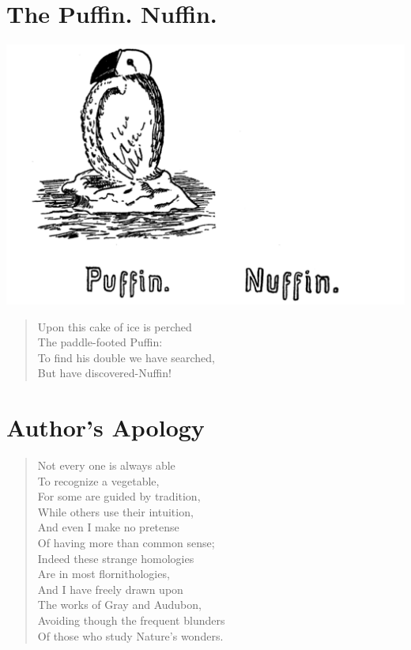 \documentclass[letterpaper, 10pt, openany]{memoir}
\begin{document}
\chapter{The Puffin. Nuffin.}
\includegraphics[width=1\textwidth]{f-p27.png}
\vspace{\onelineskip}
\begin{verse}\huge
Upon this cake of ice is perched\\
The paddle-footed Puffin:\\
To find his double we have searched,\\
But have discovered-Nuffin!\\
\end{verse}

\chapter{Author's Apology}
\begin{verse}\huge
Not every one is always able\\
To recognize a vegetable,\\
For some are guided by tradition,\\
While others use their intuition,\\
And even I make no pretense\\
Of having more than common sense;\\
Indeed these strange homologies\\
Are in most flornithologies,\\
And I have freely drawn upon\\
The works of Gray and Audubon,\\
Avoiding though the frequent blunders\\
Of those who study Nature's wonders.\\
\end{verse}
\end{document}
